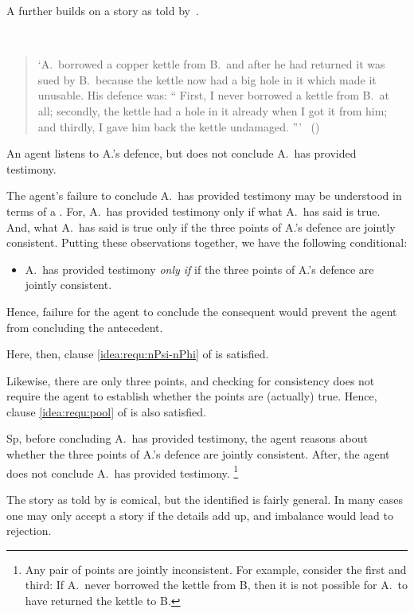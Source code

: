 \begin{note}
  A further  builds on a story as told by~\citeauthor{Freud:1960wx}.
  \begin{illustration}
    \label{illu:kettle}
    \mbox{ }
    \vspace{-\baselineskip}
    \begin{quote}
      `A.\ borrowed a copper kettle from B.\ and after he had returned it was sued by B.\ because the kettle now had a big hole in it which made it unusable.
      His defence was:
      ``%
      First, I never borrowed a kettle from B.\ at all;
      secondly, the kettle had a hole in it already when I got it from him;
      and thirdly, I gave him back the kettle undamaged.%
      '''\newline
      \mbox{ }\hfill\mbox{(\citeyear[62]{Freud:1960wx})}
    \end{quote}
    An agent listens to A.'s defence, but does not conclude A.\ has provided testimony.
  \end{illustration}

  The agent's failure to conclude A.\ has provided testimony may be understood in terms of a \requ{}.
  For, A.\ has provided testimony only if what A.\ has said is true.
  And, what A.\ has said is true only if the three points of A.'s defence are jointly consistent.
  Putting these observations together, we have the following conditional:
  \begin{itemize}
  \item
    A.\ has provided testimony \emph{only if} if the three points of A.'s defence are jointly consistent.
  \end{itemize}
  Hence, failure for the agent to conclude the consequent would prevent the agent from concluding the antecedent.

  Here, then, clause \ref{idea:requ:nPsi-nPhi} of \iRequ{} is satisfied.

  Likewise, there are only three points, and checking for consistency does not require the agent to establish whether the points are (actually) true.
  Hence, clause \ref{idea:requ:pool} of \iRequ{} is also satisfied.

  Sp, before concluding A.\ has provided testimony, the agent reasons about whether the three points of A.'s defence are jointly consistent.
  After, the agent does not conclude A.\ has provided testimony.%
  \footnote{
    Any pair of points are jointly inconsistent.
    For example, consider the first and third:
    If A.\ never borrowed the kettle from B, then it is not possible for A.\ to have returned the kettle to B.
  }

  The story as told by \citeauthor{Freud:1960wx} is comical, but the  identified is fairly general.
  In many cases one may only accept a story if the details add up, and imbalance would lead to rejection.
\end{note}


